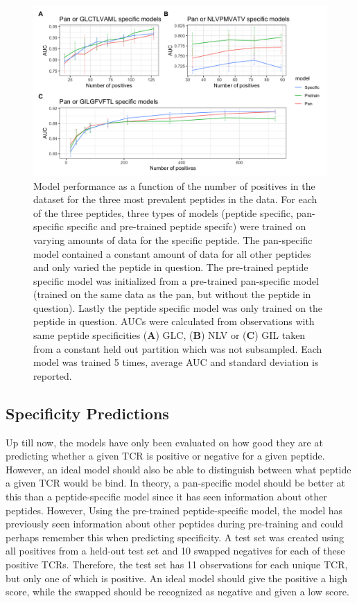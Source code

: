 \begin{figure}
    \centering
    \includegraphics[width=\linewidth]{figures/subsampling_peptide_models.png}
    \caption{Model performance as a function of the number of positives in the dataset for the three most prevalent peptides in the data. For each of the three peptides, three types of models (peptide specific, pan-specific specific and pre-trained peptide specifc) were trained on varying amounts of data for the specific peptide. The pan-specific model contained a constant amount of data for all other peptides and only varied the peptide in question. The pre-trained peptide specific model was initialized from a pre-trained pan-specific model (trained on the same data as the pan, but without the peptide in question). Lastly the peptide specific model was only trained on the peptide in question. AUCs were calculated from observations with same peptide specificities (\textbf{A}) GLC, (\textbf{B}) NLV or (\textbf{C}) GIL taken from a constant held out partition which was not subsampled. Each model was trained 5 times, average AUC and standard deviation is reported.}
    \label{fig:subsampling_models}
\end{figure}

\subsection{Specificity Predictions}
Up till now, the models have only been evaluated on how good they are at predicting whether a given TCR is positive or negative for a given peptide. However, an ideal model should also be able to distinguish between what peptide a given TCR would be bind. In theory, a pan-specific model should be better at this than a peptide-specific model since it has seen information about other peptides. However, Using the pre-trained peptide-specific model, the model has previously seen information about other peptides during pre-training and could perhaps remember this when predicting specificity. A test set was created using all positives from a held-out test set and 10 swapped negatives for each of these positive TCRs. Therefore, the test set has 11 observations for each unique TCR, but only one of which is positive. An ideal model should give the positive a high score, while the swapped should be recognized as negative and given a low score.

